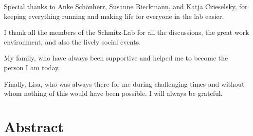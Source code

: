 \documentclass[
  12pt,
  a4paper,
  openany]{book}
\begin{document}
Special thanks to Anke Schönherr, Susanne Rieckmann, and Katja Czieselsky, for keeping everything running and making life for everyone in the lab easier.

I thank all the members of the Schmitz-Lab for all the discussions, the great work environment, and also the lively social events.

My family, who have always been supportive and helped me to become the person I am today.

Finally, Lisa, who was always there for me during challenging times and without whom nothing of this would have been possible. I will always be grateful.

\hypertarget{abstract}{%
\chapter*{Abstract}\label{abstract}}

\end{document}
